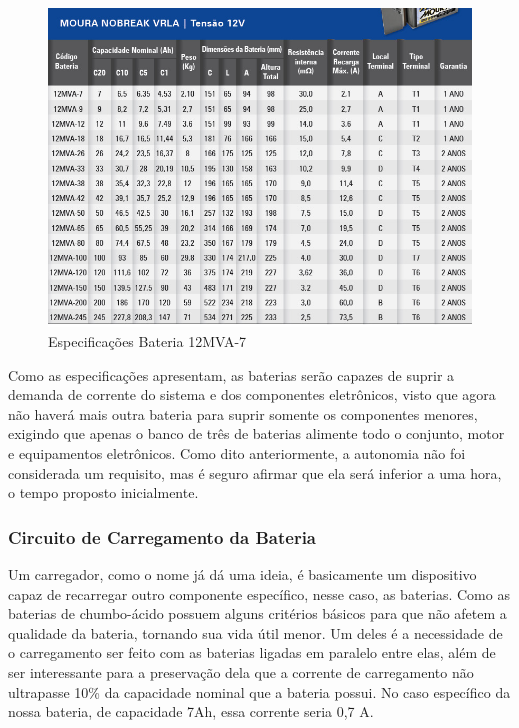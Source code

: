 	\graphicspath{{figuras/}}
	\begin{figure}[h!]
	\centering
	\includegraphics[scale=0.50]{especificacao_bateria}
	\caption{Especificações Bateria 12MVA-7}
	\label{img:esp_bateria}
	\end{figure}


Como as especificações apresentam, as baterias serão capazes de suprir a demanda de corrente do sistema e dos componentes eletrônicos, visto que agora não haverá mais outra bateria para suprir somente os componentes menores, exigindo que apenas o banco de três de baterias alimente todo o conjunto, motor e equipamentos eletrônicos. Como dito anteriormente, a autonomia não foi considerada um requisito, mas é seguro afirmar que ela será inferior a uma hora, o tempo proposto inicialmente.

\subsubsection{Circuito de Carregamento da Bateria}
Um carregador, como o nome já dá uma ideia, é basicamente um dispositivo capaz de recarregar outro componente específico, nesse caso, as baterias. Como as baterias de chumbo-ácido possuem alguns critérios básicos para que não afetem a qualidade da bateria, tornando sua vida útil menor. Um deles é a necessidade de o carregamento ser feito com as baterias ligadas em paralelo entre elas, além de ser interessante para a preservação dela que a corrente de carregamento não ultrapasse 10\% da capacidade nominal que a bateria possui. No caso específico da nossa bateria, de capacidade 7Ah, essa corrente seria 0,7 A.
   
